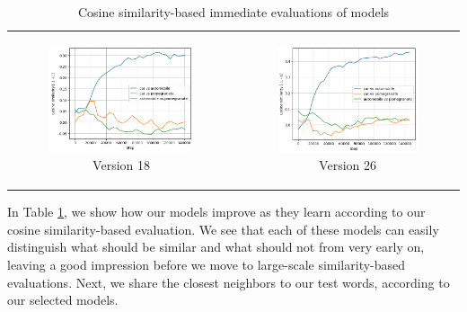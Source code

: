 \begin{table}[ht]
\begin{tabular}{cc}
\begin{subfigure}{0.45\textwidth}
      \includegraphics[width=\linewidth]{img/pom_v18.png}
      \caption{Version 18}
    \end{subfigure} &
    \begin{subfigure}{0.45\textwidth}
      \includegraphics[width=\linewidth]{img/pom_v26.png}
      \caption{Version 26}
    \end{subfigure}
  \end{tabular}
  \caption{Cosine similarity-based immediate evaluations of models}
  \label{tab:pom_plots}
\end{table}

In Table \ref{tab:pom_plots}, we show how our models improve as they learn according to our cosine similarity-based evaluation. We see that each of these models can easily distinguish what should be similar and what should not from very early on, leaving a good impression before we move to large-scale similarity-based evaluations. Next, we share the closest neighbors to our test words, according to our selected models.

